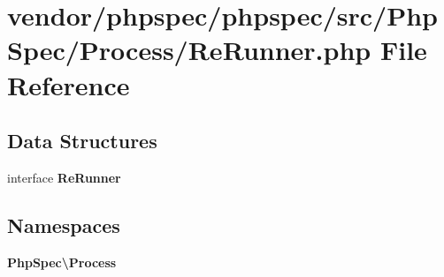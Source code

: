 \section{vendor/phpspec/phpspec/src/\+Php\+Spec/\+Process/\+Re\+Runner.php File Reference}
\label{src_2_php_spec_2_process_2_re_runner_8php}
\subsection*{Data Structures}
\begin{DoxyCompactItemize}
\item 
interface {\bf Re\+Runner}
\end{DoxyCompactItemize}
\subsection*{Namespaces}
\begin{DoxyCompactItemize}
\item 
 {\bf Php\+Spec\textbackslash{}\+Process}
\end{DoxyCompactItemize}
